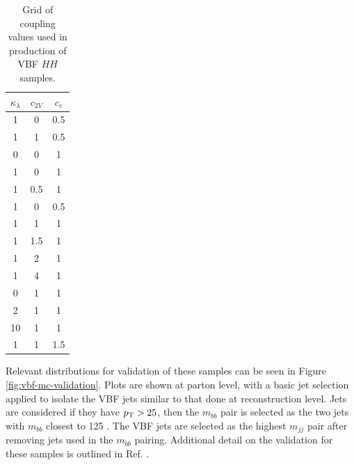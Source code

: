 \begin{table}[htbp]
    \centering
    \caption{Grid of coupling values used in production of VBF $HH$ samples.}
    \begin{tabular}{c|c|c}
        $\kappa_\lambda$ & $c_{2V}$ & $c_{v}$ \\
        \hline
        1 & 0 & 0.5 \\
        1 & 1 & 0.5 \\
        0 & 0 & 1 \\
        1 & 0 & 1 \\
        1 & 0.5 & 1 \\
        1 & 0 & 0.5 \\
        1 & 1 & 1 \\
        1 & 1.5 & 1 \\
        1 & 2 & 1 \\
        1 & 4 & 1 \\
        0 & 1 & 1 \\
        2 & 1 & 1 \\
        10 & 1 & 1 \\
        1 & 1 & 1.5
    \end{tabular}
    \label{tab:vbf-coupling-samples}
\end{table}

Relevant distributions for validation of these samples can be seen in Figure \ref{fig:vbf-mc-validation}. Plots are shown at parton level, with a basic jet selection applied to isolate the VBF jets similar to that done at reconstruction level. Jets are considered if they have $p_{\text{T}} > 25$, then the $m_{bb}$ pair is selected as the two jets with $m_{bb}$ closest to 125 \GeV. The VBF jets are selected as the highest $m_{jj}$ pair after removing jets used in the $m_{bb}$ pairing. Additional detail on the validation for these samples is outlined in Ref. \cite{mc-validation}.

